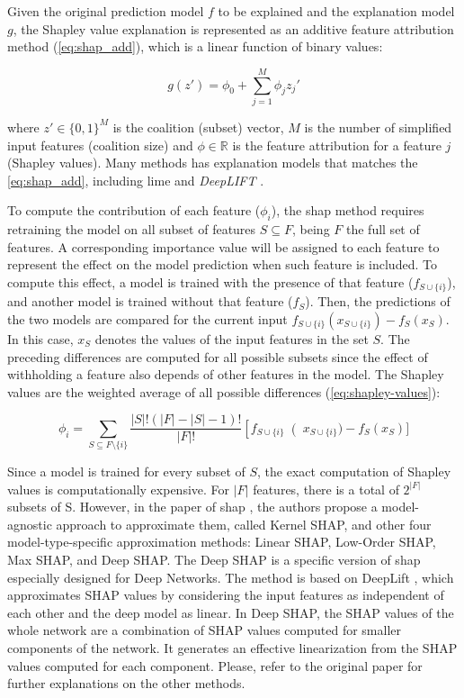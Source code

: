 Given the original prediction model $f$ to be explained and the explanation model $g$, the Shapley value explanation is represented as an additive feature attribution method (\autoref{eq:shap_add}), which is a linear function of binary values:

\begin{equation}
\label{eq:shap_add}
g(z')=\phi_0+\sum_{j=1}^M\phi_jz_j'
\end{equation}

\noindent
where $z' \in \{0,1\}^M$ is the coalition (subset) vector, $M$ is the number of simplified input features (coalition size) and $\phi \in \mathbb{R}$ is the feature attribution for a feature $j$ (Shapley values). Many methods has explanation models that matches the \autoref{eq:shap_add}, including \acs{lime} \citep{lime} and \textit{DeepLIFT} \citep{deeplift_old, deeplift_new}.

To compute the contribution of each feature ($\phi_i$), the \acs{shap} method requires retraining the model on all subset of features $S \subseteq F$, being $F$ the full set of features. A corresponding importance value will be assigned to each feature to represent the effect on the model prediction when such feature is included. To compute this effect, a model is trained with the presence of that feature ($f_{S \cup \{i\}}$), and another model is trained without that feature ($f_S$). Then, the predictions of the two models are compared for the current input $f_{S \cup \{i\}}(x_{S \cup \{i\}}) - f_S(x_S)$. In this case, $x_S$ denotes the values of the input features in the set $S$. The preceding differences are computed for all possible subsets since the effect of withholding a feature also depends of other features in the model. The Shapley values are the weighted average of all possible differences (\autoref{eq:shapley-values}):

\begin{equation}
\label{eq:shapley-values}
\phi_i = \sum_{S \subseteq F \setminus \{i\}} \frac{\left|S\right|!(\left|F\right| - \left|S\right| - 1)!}{\left|F\right|!}\left[f_{S \cup \{i\}}\right (x_{S \cup \{i\}}) - f_S(x_S)]
\end{equation}

Since a model is trained for every subset of $S$, the exact computation of Shapley values is computationally expensive. For $\left|F\right|$ features, there is a total of $2^{\left|F\right|}$ subsets of S. However, in the paper of \acs{shap} \citep{shap2018}, the authors propose a model-agnostic approach to approximate them, called Kernel SHAP, and other four model-type-specific approximation methods: Linear SHAP, Low-Order SHAP, Max SHAP, and Deep SHAP. The Deep SHAP is a specific version of \acs{shap} especially designed for Deep Networks. The method is based on DeepLift \citep{deeplift_old, deeplift_new}, which approximates SHAP values by considering the input features as independent of each other and the deep model as linear. In Deep SHAP, the SHAP values of the whole network are a combination of SHAP values computed for smaller components of the network. It generates an effective linearization from the SHAP values computed for each component. Please, refer to the original paper for further explanations on the other methods.

